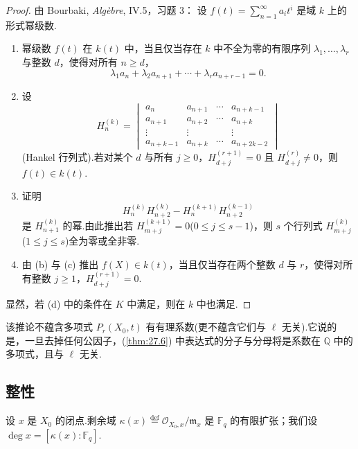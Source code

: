 \begin{proof}
由 Bourbaki, \emph{Alg\`ebre}, IV.5，习题 3：
设 $f(t) = \sum_{n=1}^{\infty} a_i t^{i}$ 是域 $k$ 上的形式幂级数.
\begin{enumerate}
  \item 幂级数 $f(t)$ 在 $k(t)$ 中，当且仅当存在 $k$ 中不全为零的有限序列 $\lambda_1, \ldots, \lambda_r$ 与整数 $d$，使得对所有 $n \geq d$，
  \[
  \lambda_1 a_n + \lambda_2 a_{n+1} + \cdots + \lambda_r a_{n+r-1} = 0.
  \]
  \item 设
  \[
  H^{(k)}_{n} = \begin{vmatrix}
  a_n & a_{n+1} & \cdots & a_{n+k-1}\\
  a_{n+1} & a_{n+2} & \cdots & a_{n+k}\\
  \vdots & \vdots & & \vdots\\
  a_{n+k-1} & a_{n+k} & \cdots & a_{n+2k-2}
  \end{vmatrix}
  \]
  (Hankel 行列式).若对某个 $d$ 与所有 $j \geq 0$，$H^{(r+1)}_{d+j} = 0$ 且 $H^{(r)}_{d+j} \neq 0$，则 $f(t) \in k(t)$.
  \item 证明
  \[
  H^{(k)}_{n} H^{(k)}_{n+2} - H^{(k+1)}_{n} H^{(k-1)}_{n+2}
  \]
  是 $H^{(k)}_{n+1}$ 的幂.由此推出若 $H^{(k+1)}_{m+j} = 0$($0 \leq j \leq s - 1$)，则 $s$ 个行列式 $H^{(k)}_{m+j}$($1 \leq j \leq s$)全为零或全非零.
  \item 由 (b) 与 (c) 推出 $f(X) \in k(t)$，当且仅当存在两个整数 $d$ 与 $r$，使得对所有整数 $j \geq 1$，$H^{(r+1)}_{d+j} = 0$.
\end{enumerate}
显然，若 (d) 中的条件在 $K$ 中满足，则在 $k$ 中也满足.
\end{proof}

该推论不蕴含多项式 $P_r(X_0, t)$ 有有理系数(更不蕴含它们与 $\ell$ 无关).它说的是，一旦去掉任何公因子，(\ref{thm:27.6}) 中表达式的分子与分母将是系数在 $\mathbb{Q}$ 中的多项式，且与 $\ell$ 无关.

\subsection*{整性}

设 $x$ 是 $X_0$ 的闭点.剩余域 $\kappa(x) \overset{\mathrm{def}}{=} \mathcal{O}_{X_0, x}/\mathfrak{m}_x$ 是 $\mathbb{F}_q$ 的有限扩张；我们设 $\deg x = [\kappa(x) \colon \mathbb{F}_q]$.

